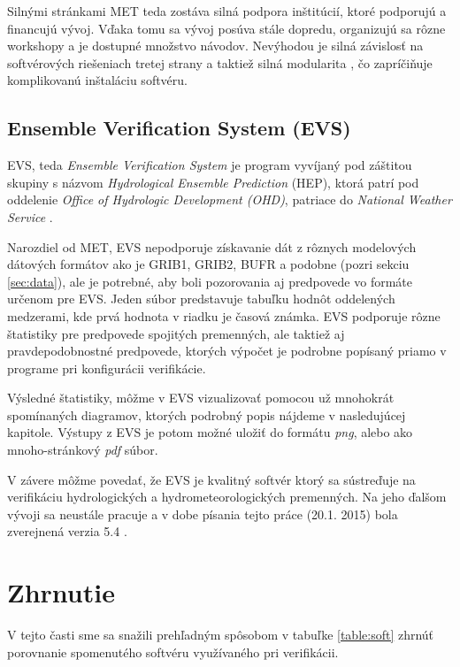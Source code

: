 Silnými stránkami MET teda zostáva silná podpora inštitúcií, ktoré podporujú a financujú vývoj. Vďaka tomu sa vývoj posúva stále dopredu, organizujú sa rôzne workshopy a je dostupné množstvo návodov. Nevýhodou je silná závislosť na softvérových riešeniach tretej strany a taktiež silná modularita , čo zapríčiňuje komplikovanú inštaláciu softvéru.

\subsection[EVS]{Ensemble Verification System (EVS)}
EVS, teda \textit{Ensemble Verification System} \cite{EVS} je program vyvíjaný pod záštitou skupiny s názvom \textit{Hydrological Ensemble Prediction} (HEP), ktorá patrí pod oddelenie \textit{Office of Hydrologic Development (OHD)}, patriace do \textit{National Weather Service} \cite{EVSmanual}.

Narozdiel od MET, EVS nepodporuje získavanie dát z rôznych modelových dátových formátov ako je GRIB1, GRIB2, BUFR a podobne (pozri sekciu \ref{sec:data}), ale je potrebné, aby boli pozorovania aj predpovede vo formáte určenom pre EVS. Jeden súbor predstavuje tabuľku hodnôt oddelených medzerami, kde prvá hodnota v riadku je časová známka. EVS podporuje rôzne štatistiky pre predpovede spojitých premenných, ale taktiež aj pravdepodobnostné predpovede, ktorých výpočet je podrobne popísaný priamo v programe pri konfigurácii verifikácie.

Výsledné štatistiky, môžme v EVS vizualizovať pomocou už mnohokrát spomínaných diagramov, ktorých podrobný popis nájdeme v nasledujúcej kapitole. Výstupy z EVS je potom možné uložiť do formátu \textit{png}, alebo ako mnoho-stránkový \textit{pdf} súbor.

V závere môžme povedať, že EVS je kvalitný softvér ktorý sa sústreďuje na verifikáciu hydrologických a hydrometeorologických premenných. Na jeho ďalšom vývoji sa neustále pracuje a v dobe písania tejto práce (20.1. 2015) bola zverejnená verzia 5.4 \cite{EVS}.


\section{Zhrnutie}
V tejto časti sme sa snažili prehľadným spôsobom v tabuľke \ref{table:soft} zhrnúť porovnanie spomenutého softvéru využívaného pri verifikácii.


